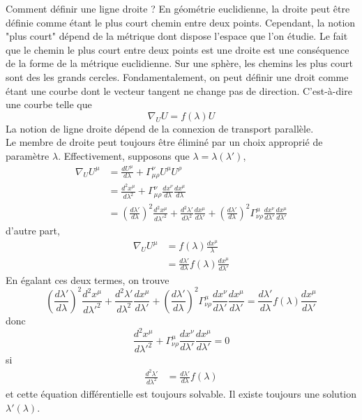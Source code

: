 \documentclass[a4paper,11pt]{report}
\begin{document}
            Comment définir une ligne droite ? En géométrie euclidienne, la droite peut être définie comme étant le plus court chemin entre deux points. Cependant, la notion "plus court" dépend de la métrique dont dispose l'espace que l'on étudie. Le fait que le chemin le plus court entre deux points est une droite est une conséquence de la forme de la métrique euclidienne. Sur une sphère, les chemins les plus court sont des les grands cercles. Fondamentalement, on peut définir une droit comme étant une courbe dont le vecteur tangent ne change pas de direction. C'est-à-dire une courbe telle que
            \begin{equation}
                \nabla_U U = f(\lambda) U
            \end{equation}
            La notion de ligne droite dépend de la connexion de transport parallèle.\\
            
            Le membre de droite peut toujours être éliminé par un choix approprié de paramètre $\lambda$. Effectivement, supposons que $\lambda = \lambda(\lambda')$,
            \begin{align}
                \nabla_U U^\mu &= \frac{dU^\mu}{d\lambda} + \Gamma^\nu_{\mu\rho} U^\mu U^\rho \\
                &= \frac{d^2x^\mu}{d\lambda^2} + \Gamma^\nu_{\mu\rho} \frac{dx^\nu}{d\lambda}\frac{dx^\mu}{d\lambda} \\
                &= \left( \frac{d\lambda'}{d\lambda} \right)^2\frac{d^2x^\mu}{d\lambda'^2}+\frac{d^2\lambda'}{d\lambda^2}\frac{dx^\mu}{d\lambda'}+\left( \frac{d\lambda'}{d\lambda} \right)^2\Gamma^\mu_{\nu\rho} \frac{dx^\nu}{d\lambda'}\frac{dx^\mu}{d\lambda'}
            \end{align}
            d'autre part, 
            \begin{align}
                \nabla_U U^\mu &= f(\lambda) \frac{dx^\mu}{\lambda} \\
                &= \frac{d\lambda'}{d\lambda}f(\lambda)\frac{dx^\mu}{d\lambda'}
            \end{align}
            En égalant ces deux termes, on trouve
            \begin{equation}
                \left( \frac{d\lambda'}{d\lambda} \right)^2\frac{d^2x^\mu}{d\lambda'^2}+\frac{d^2\lambda'}{d\lambda^2}\frac{dx^\mu}{d\lambda'}+\left( \frac{d\lambda'}{d\lambda} \right)^2\Gamma^\mu_{\nu\rho} \frac{dx^\nu}{d\lambda'}\frac{dx^\mu}{d\lambda'} = \frac{d\lambda'}{d\lambda}f(\lambda)\frac{dx^\mu}{d\lambda'}
            \end{equation}
            donc
            \begin{equation}
                \frac{d^2x^\mu}{d\lambda'^2} + \Gamma^\mu_{\nu\rho} \frac{dx^\nu}{d\lambda'}\frac{dx^\mu}{d\lambda'} = 0
            \end{equation}
            si 
            \begin{align}
                \frac{d^2\lambda'}{d\lambda^2} &= \frac{d\lambda'}{d\lambda}f(\lambda)
            \end{align}
            et cette équation différentielle est toujours solvable. Il existe toujours une solution $\lambda'(\lambda)$.
            
\end{document}
